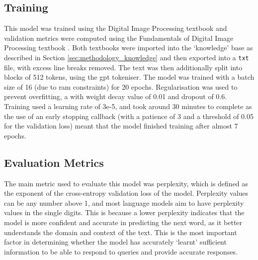 \subsection{Training}
This model was trained using the Digital Image Processing textbook \citep{gonzalez2018digital} and validation metrics were computed using the Fundamentals of Digital Image Processing textbook \citep{solomon2010fundamentals}. Both textbooks were imported into the `knowledge' base as described in Section \ref{sec:methodology_knowledge} and then exported into a \texttt{txt} file, with excess line breaks removed. The text was then additionally split into blocks of 512 tokens, using the \acrshort{gpt} tokeniser. The model was trained with a batch size of 16 (due to \acrshort{ram} constraints) for 20 epochs. Regularisation was used to prevent overfitting, a with weight decay value of 0.01 and dropout of 0.6. Training used a learning rate of 3e-5, and took around 30 minutes to complete as the use of an early stopping callback (with a patience of 3 and a threshold of 0.05 for the validation loss) meant that the model finished training after almost 7 epochs. %

\subsection{Evaluation Metrics}
The main metric used to evaluate this model was perplexity, which is defined as the exponent of the cross-entropy validation loss of the model. Perplexity values can be any number above 1, and most language models aim to have perplexity values in the single digits. This is because a lower perplexity indicates that the model is more confident and accurate in predicting the next word, as it better understands the domain and context of the text. This is the most important factor in determining whether the model has accurately `learnt' sufficient information to be able to respond to queries and provide accurate responses. 



